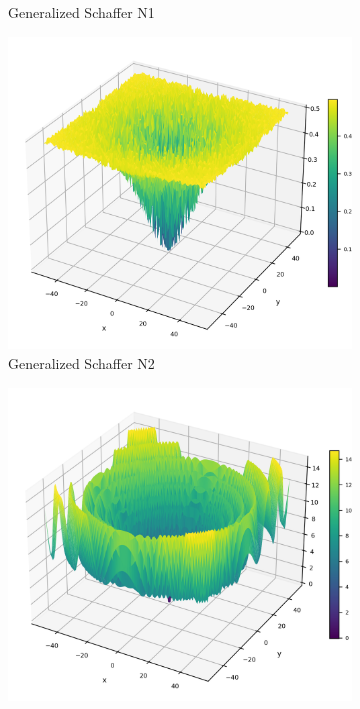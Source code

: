 \begin{figure}[!hb]
\begin{subfigure}{0.32\textwidth}
        \caption{Generalized Schaffer N1}
    \end{subfigure}
        \begin{subfigure}{0.32\textwidth}
        \centering
        \includegraphics[width=1\textwidth]{Figures/benchmark_plots/Generalized_Schaffer_N2_maximized.png}
        \caption{Generalized Schaffer N2}
    \end{subfigure}
        \begin{subfigure}{0.32\textwidth}
        \centering
        \includegraphics[width=1\textwidth]{Figures/benchmark_plots/Generalized_Schaffer_N3_maximized.png}

\end{subfigure}
\end{figure}
